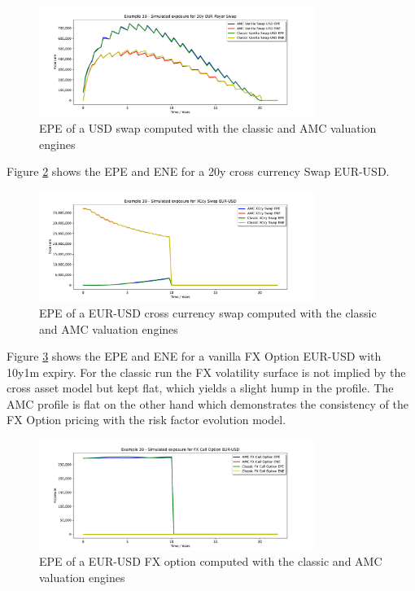 \documentclass[12pt, a4paper]{article}
\begin{document}
\begin{figure}
  \includegraphics[width=0.8\textwidth]{mpl_amc_vanillaswap_usd.pdf}
  \caption{EPE of a USD swap computed with the classic and AMC valuation engines}
  \label{epe_swap}
\end{figure}

Figure \ref{epe_ccyswap} shows the EPE and ENE for a 20y cross currency Swap EUR-USD. 

\begin{figure}
  \includegraphics[width=0.8\textwidth]{mpl_amc_xccyswap.pdf}
  \caption{EPE of a EUR-USD cross currency swap computed with the classic and AMC valuation engines}
  \label{epe_ccyswap}
\end{figure}

Figure \ref{epe_fxoption} shows the EPE and ENE for a vanilla FX Option EUR-USD with 10y1m expiry. 
For the classic run the FX volatility surface is not implied by the cross asset model but kept flat, which
yields a slight hump in the profile. The AMC profile is flat on the other hand which demonstrates the consistency of the
FX Option pricing with the risk factor evolution model.

\begin{figure}
  \includegraphics[width=0.8\textwidth]{mpl_amc_fxoption.pdf}
  \caption{EPE of a EUR-USD FX option computed with the classic and AMC valuation engines}
  \label{epe_fxoption}
\end{figure}
\end{document}
